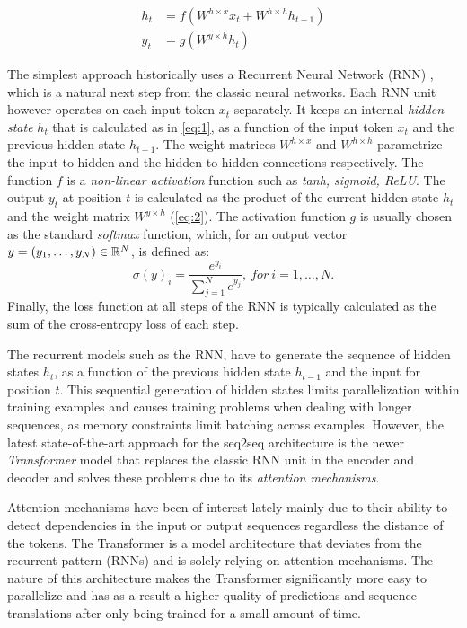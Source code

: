 \begin{align}
    h_t &= f(W^{h\times x} x_t + W^{h\times h} h_{t-1}) \label{eq:1} \\
    y_t &= g(W^{y\times h} h_t) \label{eq:2}
\end{align}

The simplest approach historically uses a Recurrent Neural Network (RNN)
\citep{Rumelhart1986, Werbos1990, Hochreiter_1997}, which is a natural next step
from the classic neural networks. Each RNN unit however operates on each input
token $x_t$ separately. It keeps an internal \emph{hidden state} $h_t$ that is
calculated as in \autoref{eq:1}, as a function of the input token $x_t$ and the
previous hidden state $h_{t-1}$. The weight matrices $W^{h\times x}$ and
$W^{h\times h}$ parametrize the input-to-hidden and the hidden-to-hidden
connections respectively. The function $f$ is a \emph{non-linear activation}
function such as \emph{tanh, sigmoid, ReLU}. The output $y_t$ at position $t$ is
calculated as the product of the current hidden state $h_t$ and the weight
matrix $W^{y\times h}$ (\autoref{eq:2}). The activation function $g$ is usually
chosen as the standard \emph{softmax} function, which, for an output vector $y =
(y_1, \dots, y_N) \in \mathbb{R}^{N}$, is defined as:
\[ \sigma(y)_i = \frac{e^{y_i}}{\sum_{j=1}^{N} e^{y_j}},\ for\ i = 1, \dots, N.
\] Finally, the loss function at all steps of the RNN is typically calculated
as the sum of the cross-entropy loss of each step.

The recurrent models such as the RNN, have to generate the sequence of hidden
states $h_t$, as a function of the previous hidden state $h_{t-1}$ and the input
for position $t$. This sequential generation of hidden states limits
parallelization within training examples and causes training problems when
dealing with longer sequences, as memory constraints limit batching across
examples. However, the latest state-of-the-art approach for the seq2seq
architecture is the newer \emph{Transformer} model \citep{Vaswani_2017} that
replaces the classic RNN unit in the encoder and decoder and solves these
problems due to its \emph{attention mechanisms}.

Attention mechanisms have been of interest lately \citep{Bahdanau2015, Kim2017,
Vaswani_2017} mainly due to their ability to detect dependencies in the input or
output sequences regardless the distance of the tokens. The Transformer is a
model architecture that deviates from the recurrent pattern (\eg RNNs) and is
solely relying on attention mechanisms. The nature of this architecture makes
the Transformer significantly more easy to parallelize and has as a result a
higher quality of predictions and sequence translations after only being trained
for a small amount of time.

